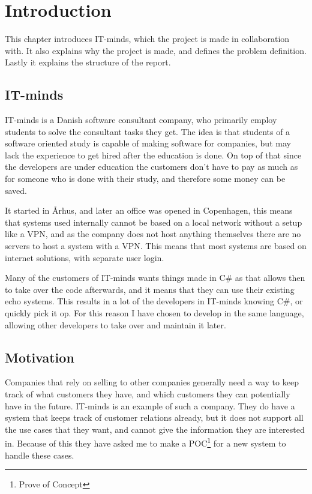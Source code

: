 \chapter{Introduction}
\label{chap:Introduction}
This chapter introduces IT-minds, which the project is made in collaboration with.
It also explains why the project is made, and defines the problem definition.
Lastly it explains the structure of the report.

\section{IT-minds}
\label{sec:IT-minds}
IT-minds is a Danish software consultant company, who primarily employ students
to solve the consultant tasks they get. The idea is that students of a software oriented
study is capable of making software for companies, but may lack the experience to get hired
after the education is done. On top of that since the developers are under education
the customers don't have to pay as much as for someone who is done with their study,
and therefore some money can be saved.

It started in Århus, and later an office was opened in Copenhagen, this means that systems
used internally cannot be based on a local network without a setup like a VPN, and as
the company does not host anything themselves there are no servers to host a system with
a VPN. This means that most systems are based on internet solutions, with separate user login.

Many of the customers of IT-minds wants things made in C\# as that allows then to
take over the code afterwards, and it means that they can use their existing echo
systems. This results in a lot of the developers in IT-minds knowing C\#, or
quickly pick it op. For this reason I have chosen to develop in the same language,
allowing other developers to take over and maintain it later.

\section{Motivation}
\label{sec:Motivation}
Companies that rely on selling to other companies generally need a way to keep track of
what customers they have, and which customers they can potentially have in the future.
IT-minds is an example of such a company. They do have a system that keeps track
of customer relations already, but it does not support all the use cases that they want,
and cannot give the information they are interested in.
Because of this they have asked me to make a POC\footnote{Prove of Concept} for a new
system to handle these cases.

